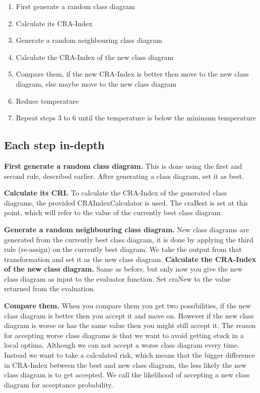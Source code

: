 \documentclass[a4paper]{article}
\begin{document}
\begin{enumerate}
  \item First generate a random class diagram
  \item Calculate its CRA-Index
  \item Generate a random neighbouring class diagram
  \item Calculate the CRA-Index of the new class diagram
  \item Compare them, if the new CRA-Index is better then move to the new
class diagram, else maybe move to the new class diagram
  \item Reduce temperature
  \item Repeat steps 3 to 6 until the temperature is below the minimum
temperature
\end{enumerate}


\subsection{Each step in-depth}

\textbf{First generate a random class diagram.}
This is done using the first and second rule, described earlier.
After generating a class diagram, set it as best.

\textbf{Calculate its CRI.}
To calculate the CRA-Index of the generated class diagrams, the provided CRAIndexCalculator is used.
The craBest is set at this point, which will refer to the value of the currently best class diagram.

\textbf{Generate a random neighbouring class diagram.}
New class diagrams are generated from the currently best class diagram, it is
done by applying the third rule (re-assign) on the currently best diagram.
We take the output from that transformation and set it as the new class diagram.
\textbf{Calculate the CRA-Index of the new class diagram.}
Same as before, but only now you give the new class diagram as input to the
evaluator function.
Set craNew to the value returned from the evaluation.

\textbf{Compare them.}
When you compare them you get two possibilities, if the new class diagram is better then you accept it and move on.
However if the new class diagram is worse or has the same value then you might still accept it.
The reason for accepting worse class diagrams is that we want to avoid getting stuck in a local optima.
Although we can not accept a worse class diagram every time.
Instead we want to take a calculated risk, which means that the bigger difference in CRA-Index between the best and new class diagram, the less likely the new class diagram is to get accepted.
We call the likelihood of accepting a new class diagram for acceptance probability.
\end{document}
